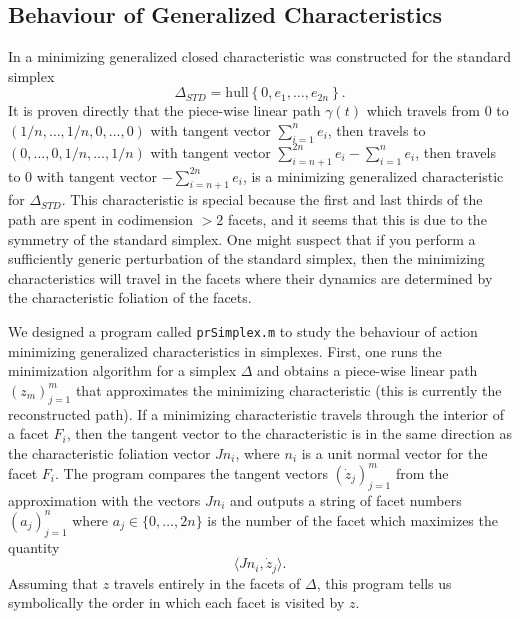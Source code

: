 \documentclass[../capacities_main.tex]{subfiles}
\begin{document}
	

\subsection{Behaviour of Generalized Characteristics}

In \cite{yaron} a minimizing generalized closed characteristic was constructed for the standard simplex 
\begin{equation*}
\Delta_{STD}  = \text{hull}\left\{ 0, e_1, \ldots, e_{2n}\right\}.
\end{equation*}
It is proven directly that the piece-wise linear path $\gamma(t)$ which travels from 0 to $(1/n,\ldots,1/n,0,\ldots,0)$ with tangent vector $\sum_{i=1}^ne_i$, then travels to $(0,\ldots,0,1/n,\ldots,1/n)$ with tangent vector $\sum_{i=n+1}^{2n}e_i - \sum_{i=1}^ne_i$, then travels to 0 with tangent vector $-\sum_{i=n+1}^{2n}e_i $, is a minimizing generalized characteristic for $\Delta_{STD}$. This characteristic is special because the first and last thirds of the path are spent in codimension $>2$ facets, and it seems that this is due to the symmetry of the standard simplex. One might suspect that if you perform a sufficiently generic perturbation of the standard simplex, then the minimizing characteristics will travel in the facets where their dynamics are determined by the characteristic foliation of the facets.

We designed a program called \texttt{prSimplex.m} to study the behaviour of action minimizing generalized characteristics in simplexes. First, one runs the minimization algorithm for a simplex $\Delta$ and obtains a piece-wise linear path $(z_m)_{j=1}^m$ that approximates the minimizing characteristic (this is currently the reconstructed path).  If a minimizing characteristic travels through the interior of a facet $F_i$, then the tangent vector to the characteristic is in the same direction as the characteristic foliation vector $Jn_i$, where $n_i$ is a unit normal vector for the facet $F_i$. The program compares the tangent vectors $(\dot z_j)_{j=1}^m$ from the approximation with the vectors $Jn_i$ and outputs a string of facet numbers $(a_j)_{j=1}^n$ where $a_j\in \{0,\ldots,2n\}$ is the number of the facet which maximizes the quantity
\begin{equation*}
\langle Jn_i,\dot z_j\rangle.
\end{equation*}
Assuming that $z$ travels entirely in the facets of $\Delta$, this program tells us symbolically the order in which each facet is visited by $z$.
\end{document}
